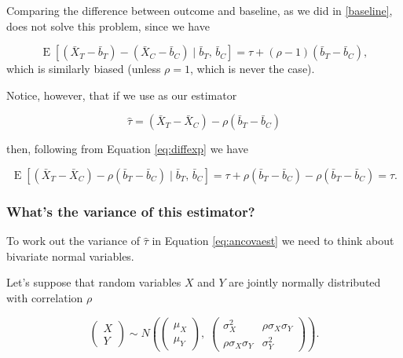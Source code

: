 \documentclass[
  openany]{book}
\theoremstyle{definition}
\theoremstyle{definition}
\theoremstyle{definition}
\theoremstyle{definition}
\theoremstyle{remark}
\begin{document}
Comparing the difference between outcome and baseline, as we did in \ref{baseline}, does not solve this problem, since we have

\[\operatorname{E}\left[\left(\bar{X}_T - \bar{b}_T\right) - \left(\bar{X}_C - \bar{b}_C\right)\mid{\bar{b}_T,\,\bar{b}_C}\right] = \tau + \left(\rho-1\right)\left(\bar{b}_T - \bar{b}_C\right),\]
which is similarly biased (unless \(\rho=1\), which is never the case).

Notice, however, that if we use as our estimator

\begin{equation}
\hat{\tau} = \left(\bar{X}_T - \bar{X}_C\right) - \rho \left(\bar{b}_T - \bar{b}_C\right)
\label{eq:ancovaest}
\end{equation}

then, following from Equation \eqref{eq:diffexp} we have

\[
\operatorname{E}\left[\left(\bar{X}_T - \bar{X}_C\right) - \rho \left(\bar{b}_T - \bar{b}_C\right)\mid{\bar{b}_T,\,\bar{b}_C}\right] = \tau + \rho\left(\bar{b}_T - \bar{b}_C\right)- \rho\left(\bar{b}_T - \bar{b}_C\right) = \tau. \]

\hypertarget{whats-the-variance-of-this-estimator}{%
\subsubsection{What's the variance of this estimator?}\label{whats-the-variance-of-this-estimator}}

To work out the variance of \(\hat{\tau}\) in Equation \eqref{eq:ancovaest} we need to think about bivariate normal variables.

Let's suppose that random variables \(X\) and \(Y\) are jointly normally distributed with correlation \(\rho\)

\begin{equation}
\begin{pmatrix}
X\\
Y
\end{pmatrix} \sim N\left(
\begin{pmatrix}
\mu_X\\
\mu_Y
\end{pmatrix},\;
\begin{pmatrix}
\sigma^2_X & \rho\sigma_X\sigma_Y \\
\rho\sigma_X\sigma_Y & \sigma^2_Y
\end{pmatrix}
\right).
\label{eq:bvn}
\end{equation}
\end{document}
